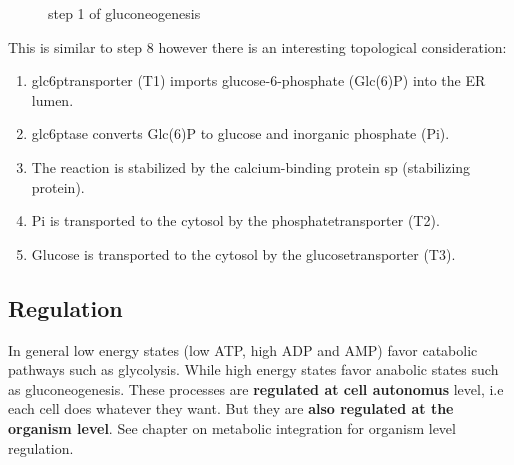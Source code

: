 \documentclass[../main.tex]{subfiles}
\begin{document}
\begin{figure}[H]
	\centering
	


	\caption{step 1 of gluconeogenesis}
\end{figure}
This is similar to step 8 however there is an interesting topological consideration:
\begin{enumerate}
    \item \gls{glc6ptransporter} (T1) imports glucose-6-phosphate (Glc(6)P) into the ER lumen.
    \item \gls{glc6ptase} converts Glc(6)P to glucose and inorganic phosphate (Pi).
    \item The reaction is stabilized by the calcium-binding protein \gls{sp} (stabilizing protein).
    \item Pi is transported to the cytosol by the \gls{phosphatetransporter} (T2).
    \item Glucose is transported to the cytosol by the \gls{glucosetransporter} (T3).
\end{enumerate}

\subsection{Regulation}
\begin{remark}
    In general low energy states (low ATP, high ADP and  AMP) favor catabolic pathways such as glycolysis. While high energy states favor anabolic states such as gluconeogenesis. These processes are\textbf{ regulated at cell autonomus} level, i.e each cell does whatever they want. But they are \textbf{also regulated at the organism level}. See chapter on metabolic integration for organism level regulation. 
\end{remark}
\end{document}

